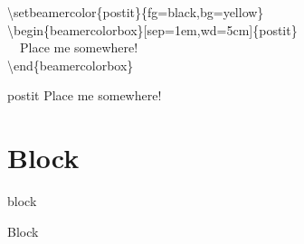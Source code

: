 \documentclass[10pt,blue,xcolor=pdftex,dvipsnames,table,handout]{beamer}
\begin{document}
		\begin{frame}

			\begin{example}
				\textbackslash setbeamercolor\{postit\}\{fg=black,bg=yellow\} \\
				\textbackslash begin\{beamercolorbox\}[sep=1em,wd=5cm]\{postit\} \\
				~~Place me somewhere! \\
				\textbackslash end\{beamercolorbox\}\\
			\end{example}


			\begin{beamercolorbox}[sep=1em,wd=5cm]{postit}
			Place me somewhere!
			\end{beamercolorbox}

		\end{frame}







		\section{Block}



		\begin{frame}[plain]
			\structure{Block}
		\end{frame}




		


		\begin{frame}[t]{block}

			\begin{block} {Block}
			\end{block}

		\end{frame}
\end{document}
